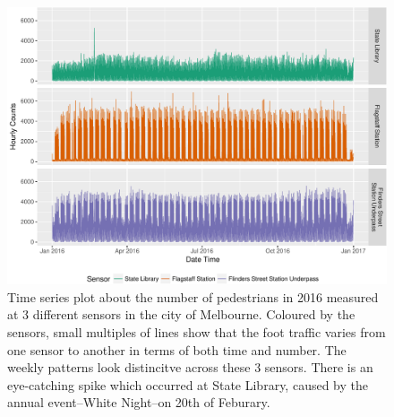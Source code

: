 \documentclass[article]{jss}
\begin{document}
\begin{CodeChunk}
\begin{figure}

{\centering \includegraphics[width=\textwidth]{figure/time-series-plot-1} 

}

\caption[Time series plot about the number of pedestrians in 2016 measured at 3 different sensors in the city of Melbourne]{Time series plot about the number of pedestrians in 2016 measured at 3 different sensors in the city of Melbourne. Coloured by the sensors, small multiples of lines show that the foot traffic varies from one sensor to another in terms of both time and number. The weekly patterns look distincitve across these 3 sensors. There is an eye-catching spike which occurred at State Library, caused by the annual event--White Night--on 20th of Feburary.}\label{fig:time-series-plot}
\end{figure}
\end{CodeChunk}
\end{document}
